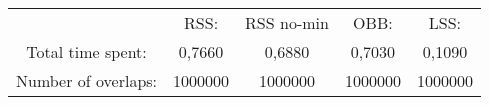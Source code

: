 \begin{tabular}{c|c|c|c|c}\\ 
& RSS: & RSS no-min & OBB: & LSS:\\ 
Total time spent: & 0,7660 & 0,6880 & 0,7030 & 0,1090\\ 
Number of overlaps: &1000000 & 1000000 & 1000000 & 1000000\\ 
\end{tabular}